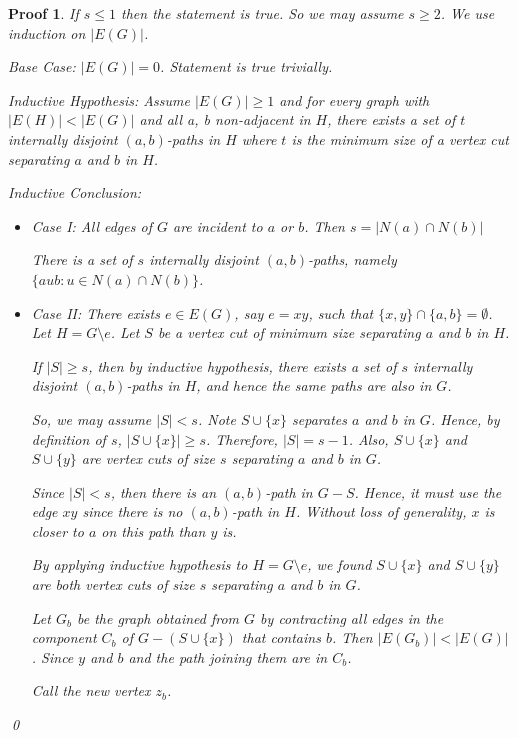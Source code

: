 \documentclass[twoside]{article}
\newtheorem{protoproof}[prototheorem]{Proof}
\renewenvironment{proof}
{\colorlet{shadecolor}{blue!15}\begin{shaded}\begin{protoproof}
		\normalfont}
		{\qed\end{protoproof}\end{shaded}}
\begin{document}
\begin{proof}
	If $s \leq 1$ then the statement is true. So we may assume $s \geq 2$. We use induction on $|E(G)|$. 
			
	Base Case: $|E(G)| = 0$. Statement is true trivially. 
			
	Inductive Hypothesis: Assume $|E(G)| \geq 1$ and for every graph with $|E(H)| < |E(G)|$ and all a, b non-adjacent in $H$, there exists a set of $t$ internally disjoint $(a, b)$-paths in $H$ where $t$ is the minimum size of a vertex cut separating $a$ and $b$ in $H$. 
			
	Inductive Conclusion: \begin{itemize}
	\item Case I: All edges of $G$ are incident to $a$ or $b$. Then $s = |N(a) \cap N(b)|$
				
	There is a set of $s$ internally disjoint $(a, b)$-paths, namely $\{a ub : u \in N(a) \cap N(b)\}$. 
				
	\item Case II: There exists $e \in E(G)$, say $e =xy$, such that $\{x, y\} \cap \{a, b\} = \emptyset$. Let $H = G \setminus e$. Let $S$ be a vertex cut of minimum size separating $a$ and $b$ in $H$. 
				
	If $|S| \geq s$, then by inductive hypothesis, there exists a set of $s$ internally disjoint $(a, b)$-paths in $H$, and hence the same paths are also in $G$. 
				
	So, we may assume $|S| < s$. Note $S \cup \{x\}$ separates $a$ and $b$ in $G$. Hence, by definition of $s$, $|S \cup \{x\}| \geq s$. Therefore, $|S| = s-1$. Also, $S \cup \{x\}$ and $S \cup \{y\}$ are vertex cuts of size $s$ separating $a$ and $b$ in $G$. 
				
	Since $|S| < s$, then there is an $(a, b)$-path in $G - S$. Hence, it must use the edge $xy$ since there is no $(a,b)$-path in $H$. Without loss of generality, $x$ is closer to $a$ on this path than $y$ is. 
				
	By applying inductive hypothesis to $H = G \setminus e$, we found $S \cup \{x\}$ and $S \cup \{y\}$ are both vertex cuts of size $s$ separating $a$ and $b$ in $G$. 
				
	Let $G_b$ be the graph obtained from $G$ by contracting all edges in the component $C_b$ of $G - (S \cup \{x\})$ that contains $b$. Then $|E(G_b)| < |E(G)|$. Since $y$ and $b$ and the path joining them are in $C_b$. 
				
	Call the new vertex $z_b$. 
				

\end{itemize}
\end{proof}
\end{document}

